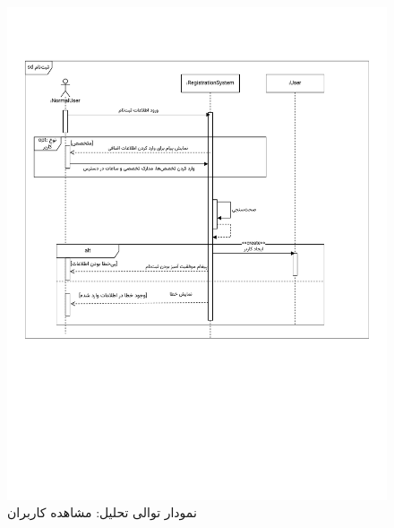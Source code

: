 \begin{figure}
	\centering
	\includegraphics[scale=0.8, page=5]{figs/OOD-Sequence-1.pdf}
	\caption{نمودار توالی تحلیل: مشاهده کاربران}
\end{figure}
\FloatBarrier
\newpage

